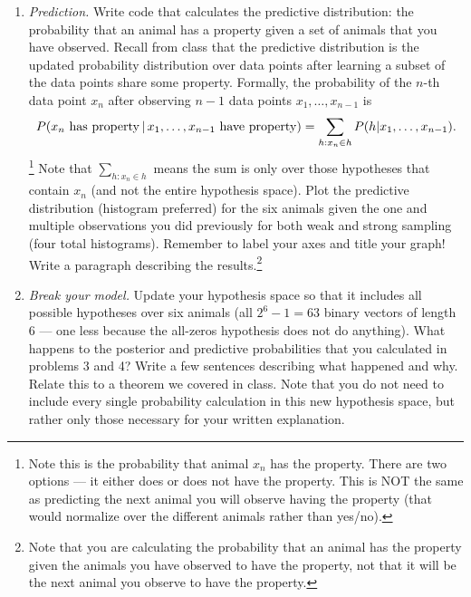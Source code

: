 \documentclass[11pt]{article}
\begin{document}
\begin{enumerate}
\begin{enumerate}
\item Update your code so that it computes the posterior probability of the hypotheses given you know more than one animal has a property. Add two more animals to the single animal and have the model observe that the three animals have a property. Describe how the posterior probability has changed (1--2 sentences) and how that differs between the weak and strong sampling models.
\end{enumerate}

\item {\em Prediction.} Write code that calculates the predictive distribution: the probability that an animal has a property given a set of animals that you have observed. Recall from class that the predictive distribution is the updated probability distribution over data points after learning a subset of the data points share some property. Formally, the probability of the $n$-th data point $x_n$ after observing $n-1$ data points $x_1, \dotsc, x_{n-1}$ is
\[
P(x_n {\rm \ has\ property}\,|\, x_1,\dotsc,x_{n-1} {\rm \ have\ property}) = \sum_{h: x_n \in h}{P(h|x_1,\dotsc,x_{n-1})}.
\]
\footnote{Note this is the probability that animal $x_n$ has the property. There are two options --- it either does or does not have the property. This is NOT the same as predicting the next animal you will observe having the property (that would normalize over the different animals rather than yes/no).} Note that $\sum_{h: x_n\in h}$ means the sum is only over those hypotheses that contain $x_n$ (and not the entire hypothesis space). Plot the predictive distribution (histogram preferred) for the six animals given the one and multiple observations you did previously for both weak and strong sampling (four total histograms). Remember to label your axes and title your graph! Write a paragraph describing the results.\footnote{Note that you are calculating the probability that an animal has the property given the animals you have observed to have the property, not that it will be the next animal you observe to have the property.}

\item {\em Break your model.} Update your hypothesis space so that it includes all possible hypotheses over six animals (all $2^{6}-1=63$ binary vectors of length 6 --- one less because the all-zeros hypothesis does not do anything). What happens to the posterior and predictive probabilities that you calculated in problems 3 and 4? Write a few sentences describing what happened and why. Relate this to a theorem we covered in class. Note that you do not need to include every single probability calculation in this new hypothesis space, but rather only those necessary for your written explanation.
\end{enumerate}
\end{document}
